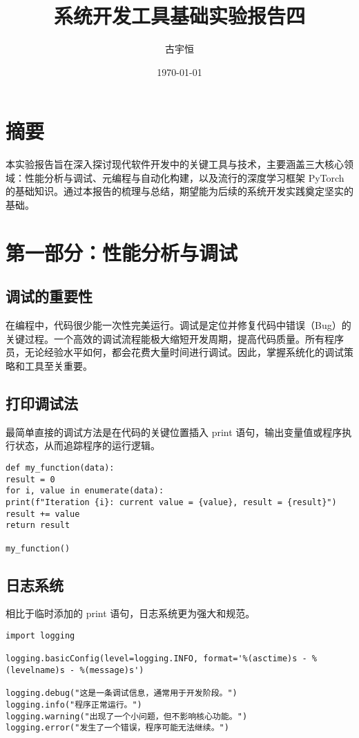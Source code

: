 \documentclass[UTF8]{gyh}
\title{系统开发工具基础实验报告四}
\author{古宇恒}
\date{\today}
\begin{document}
\fancyfoot[C]{\thepage}

\maketitle
\tableofcontents
\newpage

\section{摘要}
本实验报告旨在深入探讨现代软件开发中的关键工具与技术，主要涵盖三大核心领域：性能分析与调试、元编程与自动化构建，以及流行的深度学习框架 PyTorch 的基础知识。通过本报告的梳理与总结，期望能为后续的系统开发实践奠定坚实的基础。

\section{第一部分：性能分析与调试}
\subsection{调试的重要性}
在编程中，代码很少能一次性完美运行。调试是定位并修复代码中错误（Bug）的关键过程。一个高效的调试流程能极大缩短开发周期，提高代码质量。所有程序员，无论经验水平如何，都会花费大量时间进行调试。因此，掌握系统化的调试策略和工具至关重要。

\subsection{打印调试法}
最简单直接的调试方法是在代码的关键位置插入 print 语句，输出变量值或程序执行状态，从而追踪程序的运行逻辑。

\begin{lstlisting}
def my_function(data):
result = 0
for i, value in enumerate(data):
print(f"Iteration {i}: current value = {value}, result = {result}")
result += value
return result

my_function()
\end{lstlisting}

\subsection{日志系统}
相比于临时添加的 print 语句，日志系统更为强大和规范。

\begin{lstlisting}
import logging

logging.basicConfig(level=logging.INFO, format='%(asctime)s - %(levelname)s - %(message)s')

logging.debug("这是一条调试信息，通常用于开发阶段。")
logging.info("程序正常运行。")
logging.warning("出现了一个小问题，但不影响核心功能。")
logging.error("发生了一个错误，程序可能无法继续。")
\end{lstlisting}
\end{document}

